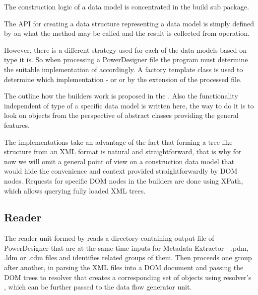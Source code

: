 The construction logic of a data model is concentrated in the build sub package.

The API for creating a data structure representing a data model is simply defined by  on what the method  may be called and the result is collected from  operation.

However, there is a different strategy used for each of the data models based on type it is. So when processing a PowerDesigner file the program must determine the suitable implementation of  accordingly. 
A factory template class  is used to determine which implementation -  or  or  by the extension of the processed file.

The outline how the builders work is proposed in the . Also the functionality independent of type of a specific data model is written here, the way to do it is to look on objects from the perspective of abstract classes providing the general features.

The implementations take an advantage of the fact that forming a tree like structure from an XML format is natural and straightforward, that is why for now we will omit a general point of view on a construction data model that would hide the convenience and context provided straightforwardly by DOM nodes. 
Requests for specific DOM nodes in the builders are done using XPath, which allows querying fully loaded XML trees.

\subsection{Reader}

The reader unit formed by  reads a directory containing output file of PowerDesigner that are at the same time inputs for Metadata Extractor - .pdm, .ldm or .cdm files and identifies related groups of them. Then proceeds one group after another, in parsing the XML files into a DOM document and passing the DOM trees to resolver that creates a corresponding set of  objects using resolver's , which can be further passed to the data flow generator unit.
 
